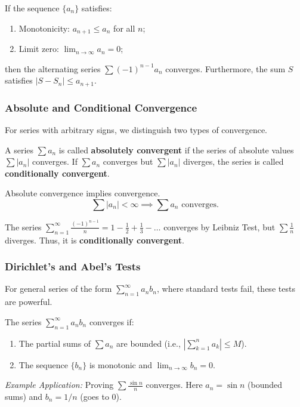 \documentclass[oneside]{book}
\begin{document}
\begin{theorem}
If the sequence $\{a_n\}$ satisfies:
\begin{enumerate}
    \item Monotonicity: $a_{n+1} \le a_n$ for all $n$;
    \item Limit zero: $\lim_{n \to \infty} a_n = 0$;
\end{enumerate}
then the alternating series $\sum (-1)^{n-1} a_n$ converges.
Furthermore, the sum $S$ satisfies $|S - S_n| \le a_{n+1}$.
\end{theorem}

\subsubsection{Absolute and Conditional Convergence}
For series with arbitrary signs, we distinguish two types of convergence.

\begin{definition}
A series $\sum a_n$ is called \textbf{absolutely convergent} if the series of absolute values $\sum |a_n|$ converges.
If $\sum a_n$ converges but $\sum |a_n|$ diverges, the series is called \textbf{conditionally convergent}.
\end{definition}

\begin{theorem}
Absolute convergence implies convergence.
\[ \sum |a_n| < \infty \implies \sum a_n \text{ converges}. \]
\end{theorem}

\begin{example}
The series $\sum_{n=1}^{\infty} \frac{(-1)^{n-1}}{n} = 1 - \frac{1}{2} + \frac{1}{3} - \dots$ converges by Leibniz Test, but $\sum \frac{1}{n}$ diverges. Thus, it is \textbf{conditionally convergent}.
\end{example}

\subsubsection{Dirichlet's and Abel's Tests}
For general series of the form $\sum_{n=1}^{\infty} a_n b_n$, where standard tests fail, these tests are powerful.

\begin{theorem}
The series $\sum_{n=1}^{\infty} a_n b_n$ converges if:
\begin{enumerate}
    \item The partial sums of $\sum a_n$ are bounded (i.e., $|\sum_{k=1}^n a_k| \le M$).
    \item The sequence $\{b_n\}$ is monotonic and $\lim_{n \to \infty} b_n = 0$.
\end{enumerate}
\end{theorem}
\textit{Example Application:} Proving $\sum \frac{\sin n}{n}$ converges. Here $a_n = \sin n$ (bounded sums) and $b_n = 1/n$ (goes to 0).
\end{document}
